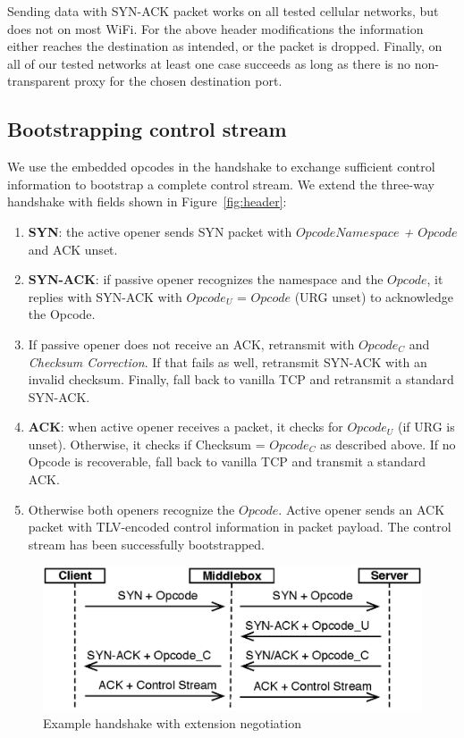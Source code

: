 \documentclass{sig-alternate-10pt}
\begin{document}
Sending data with SYN-ACK packet works on all tested cellular networks, but does not on most WiFi. For the above header modifications the information either reaches the destination as intended, or the packet is dropped. Finally, on all of our tested networks at least one case succeeds as long as there is no non-transparent proxy for the chosen destination port.

\subsection{Bootstrapping control stream}

We use the embedded opcodes in the handshake to exchange sufficient control information to bootstrap a complete control stream. We extend the three-way handshake with fields shown in Figure~\ref{fig:header}:

\begin{enumerate}
\item \textbf{SYN}: the active opener sends SYN packet with \emph{$Opcode Namespace$ + $Opcode$} and ACK unset.
\item \textbf{SYN-ACK}: if passive opener recognizes the namespace and the $Opcode$, it replies with SYN-ACK with $Opcode_U$ = $Opcode$ (URG unset) to acknowledge the Opcode.
\item If passive opener does not receive an ACK, retransmit with $Opcode_C$ and \emph{Checksum Correction}. If that fails as well, retransmit SYN-ACK with an invalid checksum. Finally, fall back to vanilla TCP and retransmit a standard SYN-ACK.
\item \textbf{ACK}: when active opener receives a packet, it checks for $Opcode_U$ (if URG is unset). Otherwise, it checks if Checksum = $Opcode_C$ as described above. If no Opcode is recoverable, fall back to vanilla TCP and transmit a standard ACK.
\item Otherwise both openers recognize the $Opcode$. Active opener sends an ACK packet with TLV-encoded control information in packet payload. The control stream has been successfully bootstrapped.
\end{enumerate}

\begin{figure}[t!]
\centering
\includegraphics[width=.9\columnwidth]{figs/handshake}
\caption{Example handshake with extension negotiation}
\label{fig:handshake}
\vspace{-4mm}
\end{figure}
\end{document}
